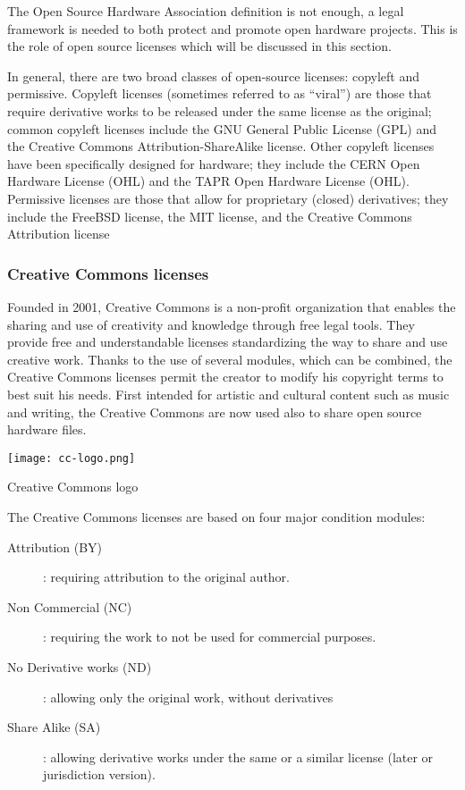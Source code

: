 The Open Source Hardware Association definition is not enough, a legal framework is needed to both protect and promote open hardware projects. This is the role of open source licenses which will be discussed in this section.

In general, there are two broad classes of open-source licenses: copyleft and permissive. Copyleft licenses (sometimes referred to as “viral”) are those that require derivative works to be released under the same license as the original; common copyleft licenses include the GNU General Public License (GPL) and the Creative Commons Attribution-ShareAlike license. Other copyleft licenses have been specifically designed for hardware; they include the CERN Open Hardware License (OHL) and the TAPR Open Hardware License (OHL). Permissive licenses are those that allow for proprietary (closed) derivatives; they include the FreeBSD license, the MIT license, and the Creative Commons Attribution license


\subsubsection{Creative Commons licenses} %
\begin{row}{4}{2}
    \begin{cell}{3}
        Founded in 2001, Creative Commons is a non-profit organization that enables the sharing and use of creativity and knowledge through free legal tools. They provide free and understandable licenses standardizing the way to share and use creative work. Thanks to the use of several modules, which can be combined, the Creative Commons licenses permit the creator to modify his copyright terms to best suit his needs. First intended for artistic and cultural content such as music and writing, the Creative Commons are now used also to share open source hardware files.
    \end{cell}
    \begin{cell}{1}
        \begin{NFfigure}
            \centering
                \texttt{[image: cc-logo.png]}
            \caption{Creative Commons logo}
            \label{fig:cc_logo}
        \end{NFfigure}
    \end{cell}
\end{row}
The Creative Commons licenses are based on four major condition modules:
\begin{description}
    \item[Attribution (BY)]: requiring attribution to the original author.
    \item[Non Commercial (NC)]: requiring the work to not be used for commercial purposes.
    \item[No Derivative works (ND)]: allowing only the original work, without derivatives
    \item[Share Alike (SA)]: allowing derivative works under the same or a similar license (later or jurisdiction version).
\end{description}


